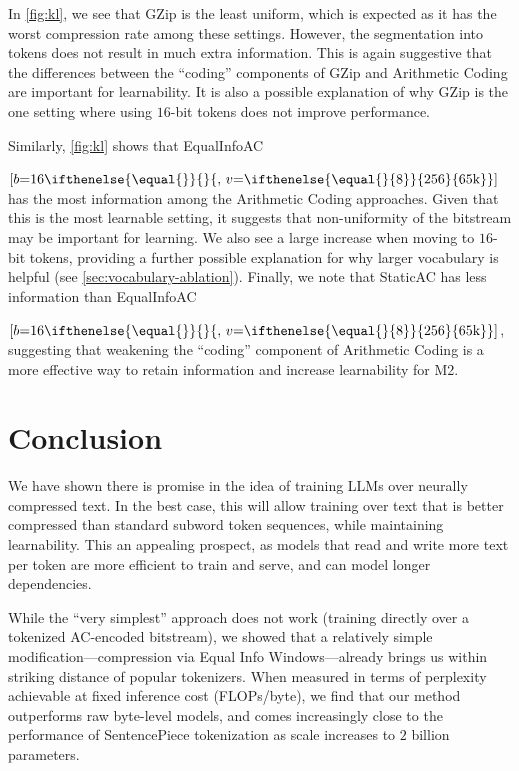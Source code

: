 In \ref{fig:kl}, we see that GZip\ifthenelse{\equal{}}{}{$[v\mathord{=}\ifthenelse{\equal{}{8}}{256}{65\text{k}}]$} is the least uniform, which is expected as it has the worst compression rate among these settings. However, the segmentation into tokens does not result in much extra information. This is again suggestive that the differences between the ``coding'' components of GZip\ifthenelse{\equal{}}{}{$[v\mathord{=}\ifthenelse{\equal{}{8}}{256}{65\text{k}}]$} and Arithmetic Coding are important for learnability. It is also a possible explanation of why GZip\ifthenelse{\equal{}}{}{$[v\mathord{=}\ifthenelse{\equal{}{8}}{256}{65\text{k}}]$} is the one setting where using $16$-bit tokens does not improve performance.

Similarly, \ref{fig:kl} shows that EqualInfoAC

  {$[b\mathord{=}16\ifthenelse{\equal{}}{}{,\,v\mathord{=}\ifthenelse{\equal{}{8}}{256}{65\text{k}}}]$} has the most information among the Arithmetic Coding approaches. Given that this is the most learnable setting, it suggests that non-uniformity of the bitstream may be important for learning. We also see a large increase when moving to $16$-bit tokens, providing a further possible explanation for why larger vocabulary is helpful (see \ref{sec:vocabulary-ablation}). Finally, we note that StaticAC\ifthenelse{\equal{}}{}{$[v\mathord{=}\ifthenelse{\equal{}{8}}{256}{65\text{k}}]$} has less information than EqualInfoAC

  {$[b\mathord{=}16\ifthenelse{\equal{}}{}{,\,v\mathord{=}\ifthenelse{\equal{}{8}}{256}{65\text{k}}}]$}, suggesting that weakening the ``coding'' component of Arithmetic Coding is a more effective way to retain information and increase learnability for M2.

\section{Conclusion}

We have shown there is promise in the idea of training LLMs over neurally compressed text. In the best case, this will allow training over text that is better compressed than standard subword token sequences, while maintaining learnability. This an appealing prospect, as models that read and write more text per token are more efficient to train and serve, and can model longer dependencies.

While the ``very simplest'' approach does not work (training directly over a tokenized AC-encoded bitstream), we showed that a relatively simple modification---compression via Equal Info Windows---already brings us within striking distance of popular tokenizers. When measured in terms of perplexity achievable at fixed inference cost (FLOPs/byte), we find that our method outperforms raw byte-level models, and comes increasingly close to the performance of SentencePiece tokenization as scale increases to $2$ billion parameters.

